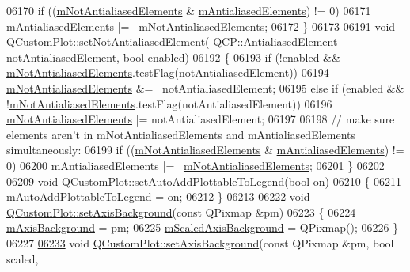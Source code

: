 \begin{DoxyCode}
06170   \textcolor{keywordflow}{if} ((\hyperlink{a00116_ac566e9d774e49dc4190346e02f31dcdf}{mNotAntialiasedElements} & \hyperlink{a00116_a18feaee1080c45b74782bdbf0c252f89}{mAntialiasedElements}) != 0)
06171     mAntialiasedElements |= ~\hyperlink{a00116_ac566e9d774e49dc4190346e02f31dcdf}{mNotAntialiasedElements};
06172 \}
06173 
\hypertarget{a00115_source_l06191}{}\hyperlink{a00116_afc657938a707c890e449ae89203a076d}{06191} \textcolor{keywordtype}{void} \hyperlink{a00116_afc657938a707c890e449ae89203a076d}{QCustomPlot::setNotAntialiasedElement}(
      \hyperlink{a00143_ae55dbe315d41fe80f29ba88100843a0c}{QCP::AntialiasedElement} notAntialiasedElement, \textcolor{keywordtype}{bool} enabled)
06192 \{
06193   \textcolor{keywordflow}{if} (!enabled && \hyperlink{a00116_ac566e9d774e49dc4190346e02f31dcdf}{mNotAntialiasedElements}.testFlag(notAntialiasedElement))
06194     \hyperlink{a00116_ac566e9d774e49dc4190346e02f31dcdf}{mNotAntialiasedElements} &= ~notAntialiasedElement;
06195   \textcolor{keywordflow}{else} \textcolor{keywordflow}{if} (enabled && !\hyperlink{a00116_ac566e9d774e49dc4190346e02f31dcdf}{mNotAntialiasedElements}.testFlag(notAntialiasedElement))
06196     \hyperlink{a00116_ac566e9d774e49dc4190346e02f31dcdf}{mNotAntialiasedElements} |= notAntialiasedElement;
06197   
06198   \textcolor{comment}{// make sure elements aren't in mNotAntialiasedElements and mAntialiasedElements simultaneously:}
06199   \textcolor{keywordflow}{if} ((\hyperlink{a00116_ac566e9d774e49dc4190346e02f31dcdf}{mNotAntialiasedElements} & \hyperlink{a00116_a18feaee1080c45b74782bdbf0c252f89}{mAntialiasedElements}) != 0)
06200     mAntialiasedElements |= ~\hyperlink{a00116_ac566e9d774e49dc4190346e02f31dcdf}{mNotAntialiasedElements};
06201 \}
06202 
\hypertarget{a00115_source_l06209}{}\hyperlink{a00116_ad8858410c2db47b7104040a3aa61c3fc}{06209} \textcolor{keywordtype}{void} \hyperlink{a00116_ad8858410c2db47b7104040a3aa61c3fc}{QCustomPlot::setAutoAddPlottableToLegend}(\textcolor{keywordtype}{bool} on)
06210 \{
06211   \hyperlink{a00116_ada47453c490f699c82bb400d749b2cf4}{mAutoAddPlottableToLegend} = on;
06212 \}
06213 
\hypertarget{a00115_source_l06222}{}\hyperlink{a00116_a6e61739de7485e99171c0fd5a57e27aa}{06222} \textcolor{keywordtype}{void} \hyperlink{a00116_a6e61739de7485e99171c0fd5a57e27aa}{QCustomPlot::setAxisBackground}(\textcolor{keyword}{const} QPixmap &pm)
06223 \{
06224   \hyperlink{a00116_ab93f80321dad937ebc6f2eaad1640c50}{mAxisBackground} = pm;
06225   \hyperlink{a00116_a9c0be35152f1cb89789149791f99044c}{mScaledAxisBackground} = QPixmap();
06226 \}
06227 
\hypertarget{a00115_source_l06233}{}\hyperlink{a00116_a010330bf3686716b9f7d643b3f5205db}{06233} \textcolor{keywordtype}{void} \hyperlink{a00116_a6e61739de7485e99171c0fd5a57e27aa}{QCustomPlot::setAxisBackground}(\textcolor{keyword}{const} QPixmap &pm, \textcolor{keywordtype}{bool} scaled, 

\end{DoxyCode}
